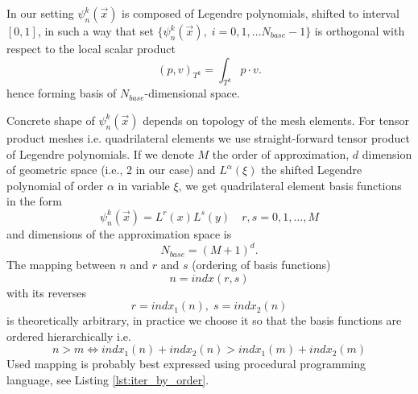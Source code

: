 In our setting $\psi_n^k(\vec{x})$ is composed of Legendre polynomials, shifted 
to interval $[0, 1]$, in such a way that set $\{\psi_n^k(\vec{x}),\; i = 0,1, 
\dots  N_{base} - 1\}$ is orthogonal with respect to the local scalar product
\begin{equation}
	\label{eq:scalar_prod_dk}
	(p, v)_{T^k} = \int_{T^k} p \cdot v.
\end{equation}
hence forming basis of $N_{base}$-dimensional space. 


Concrete shape of $\psi_n^k(\vec{x})$ depends on topology of the mesh elements. For 
tensor product meshes i.e. quadrilateral elements we use straight-forward 
tensor product of Legendre polynomials. If we denote $M$ the order of 
approximation, $d$ dimension of geometric space (i.e., 2 in our case) and $L^\alpha(\xi)$ 
the shifted Legendre polynomial of order $\alpha$ in variable $\xi$, we get 
quadrilateral element basis functions in the form
\begin{equation}
\psi_n^k(\vec{x}) = L^r(x)L^s(y)\quad r, s = 0,1, \dots, M
\end{equation}
and dimensions of the approximation space is
\begin{equation}
	N_{base} = (M + 1)^d.
\end{equation}
The mapping between $n$ and $r$ and $s$ (ordering of basis functions) 
\begin{equation}
\label{eq:bindx}
	n = indx(r, s)
\end{equation}
with its reverses
\begin{equation}
	r = indx_1(n),\; s = indx_2(n)
\end{equation}
is theoretically arbitrary, in practice we choose it so that the basis functions are ordered hierarchically i.e.
\begin{equation}
	n > m \Leftrightarrow indx_1(n) + indx_2(n) > indx_1(m) + indx_2(m)
\end{equation}
Used mapping is probably best expressed using procedural programming language,
see Listing \ref{lst:iter_by_order}.

